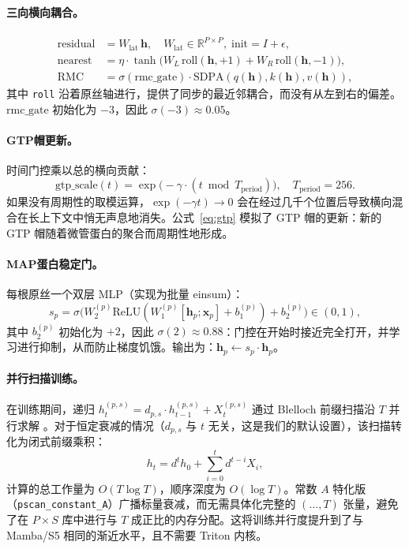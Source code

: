 \documentclass[11pt]{article}
\theoremstyle{definition}
\newcommand{\RR}{\mathbb{R}}
\newcommand{\vh}{\mathbf{h}}
\newcommand{\vx}{\mathbf{x}}
\newcommand{\sigmoid}{\sigma}
\begin{document}
\paragraph{三向横向耦合。}
\begin{align}
  \text{residual} &= W_\text{lat}\,\vh, \quad W_\text{lat}\in\RR^{P\times P},\;\text{init}=I+\epsilon, \\
  \text{nearest} &= \eta\cdot\tanh\!\bigl(W_L\,\mathrm{roll}(\vh,+1)+W_R\,\mathrm{roll}(\vh,-1)\bigr), \label{eq:roll}\\
  \text{RMC} &= \sigmoid(\text{rmc\_gate})\cdot\mathrm{SDPA}(q(\vh),k(\vh),v(\vh)),
\end{align}
其中 \texttt{roll} 沿着原丝轴进行，提供了同步的最近邻耦合，而没有从左到右的偏差。$\text{rmc\_gate}$ 初始化为 $-3$，因此 $\sigmoid(-3)\approx 0.05$。

\paragraph{GTP帽更新。}
时间门控乘以总的横向贡献：
\begin{equation}
  \text{gtp\_scale}(t) = \exp\!\bigl(-\gamma\cdot(t\bmod T_\text{period})\bigr), \quad T_\text{period}=256.
  \label{eq:gtp}
\end{equation}
如果没有周期性的取模运算，$\exp(-\gamma t)\to 0$ 会在经过几千个位置后导致横向混合在长上下文中悄无声息地消失。公式~\eqref{eq:gtp} 模拟了 GTP 帽的更新：新的 GTP 帽随着微管蛋白的聚合而周期性地形成。

\paragraph{MAP蛋白稳定门。}
每根原丝一个双层 MLP（实现为批量 einsum）：
\begin{equation}
  s_p = \sigmoid\!\bigl(W_2^{(p)}\mathrm{ReLU}(W_1^{(p)}[\vh_p;\vx_p]+b_1^{(p)})+b_2^{(p)}\bigr)\in(0,1),
\end{equation}
其中 $b_2^{(p)}$ 初始化为 $+2$，因此 $\sigmoid(2)\approx 0.88$：门控在开始时接近完全打开，并学习进行抑制，从而防止梯度饥饿。输出为：$\vh_p\leftarrow s_p\cdot\vh_p$。

\paragraph{并行扫描训练。}
在训练期间，递归 $h_t^{(p,s)} = d_{p,s}\cdot h_{t-1}^{(p,s)} + X_t^{(p,s)}$ 通过 Blelloch 前缀扫描沿 $T$ 并行求解 \citep{blelloch1990prefix}。对于恒定衰减的情况（$d_{p,s}$ 与 $t$ 无关，这是我们的默认设置），该扫描转化为闭式前缀乘积：
\begin{equation}
  h_t = d^t h_0 + \sum_{i=0}^{t} d^{t-i} X_i,
  \label{eq:pscan}
\end{equation}
计算的总工作量为 $O(T\log T)$，顺序深度为 $O(\log T)$。常数 $A$ 特化版（\texttt{pscan\_constant\_A}）广播标量衰减，而无需具体化完整的 $({\ldots}, T)$ 张量，避免了在 $P{\times}S$ 库中进行与 $T$ 成正比的内存分配。这将训练并行度提升到了与 Mamba/S5 相同的渐近水平，且不需要 Triton 内核。
\end{document}
